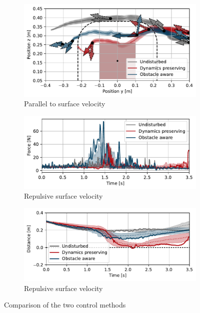 \begin{figure}
    \centering
    \begin{subfigure}{\columnwidth}
      \centerline{\includegraphics[width=\textwidth]{figures/robot_arm_trajectory_xyz}}
      \caption{Parallel to surface velocity}
      \label{fig:robot_arm_trajectory_xyz}
    \end{subfigure}
    \begin{subfigure}{\columnwidth}
    \includegraphics[width=\textwidth]{figures/trajectory_comparison_force_magnitude}
      \caption{Repulsive surface velocity}
      \label{fig:trajectory_comparison_force_magnitude}
    \end{subfigure}
    \begin{subfigure}{\columnwidth}
       \includegraphics[width=\textwidth]{figures/robot_arm_trajectory_distance}
      \caption{Repulsive surface velocity}
      \label{fig:disturbance_with_repulsive_velocity}
    \end{subfigure}
    \caption{Comparison of the two control methods}
    \label{fig:evaluation_on_robot_arm}
\end{figure}

